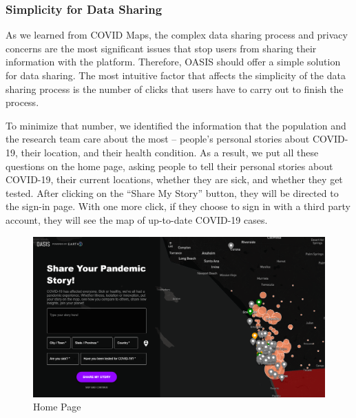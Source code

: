 \documentclass{ucsdreport}
\begin{document}
\subsubsection{Simplicity for Data Sharing }
As we learned from COVID Maps, the complex data sharing process and privacy
concerns are the most significant issues that stop users from sharing their 
information with the platform. Therefore, OASIS should offer a simple solution
for data sharing. The most intuitive factor that affects the simplicity of the
data sharing process is the number of clicks that users have to carry out to
finish the process. 

To minimize that number, we identified the information that the population and 
the research team care about the most -- people’s personal stories about 
COVID-19, their location, and their health condition. As a result, we put all
these questions on the home page, asking people to tell their personal stories
about COVID-19, their current locations, whether they are sick, and whether 
they get tested. After clicking on the “Share My Story” button, they will be 
directed to the sign-in page. With one more click, if they choose to sign in
with a third party account, they will see the map of up-to-date COVID-19 
cases. 

\begin{figure}[H]
    \centering
    \includegraphics[scale=0.45]{images/homepage.png}
    \caption{Home Page}
\end{figure}
\end{document}
